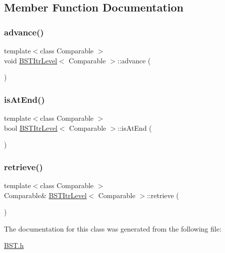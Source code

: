 \subsection{Member Function Documentation}
\mbox{\label{class_b_s_t_itr_level_ad54a6fa289a59d6050b507abe40d463b}} 
\subsubsection{\texorpdfstring{advance()}{advance()}}
{\footnotesize\ttfamily template$<$class Comparable $>$ \\
void \hyperlink{class_b_s_t_itr_level}{B\+S\+T\+Itr\+Level}$<$ Comparable $>$\+::advance (\begin{DoxyParamCaption}{ }\end{DoxyParamCaption})}

\mbox{\label{class_b_s_t_itr_level_a89bc8e81dde255fd6bad917cacc0d489}} 
\subsubsection{\texorpdfstring{is\+At\+End()}{isAtEnd()}}
{\footnotesize\ttfamily template$<$class Comparable $>$ \\
bool \hyperlink{class_b_s_t_itr_level}{B\+S\+T\+Itr\+Level}$<$ Comparable $>$\+::is\+At\+End (\begin{DoxyParamCaption}{ }\end{DoxyParamCaption})\hspace{0.3cm}{\ttfamily [inline]}}

\mbox{\label{class_b_s_t_itr_level_a0340bd9f21f72ae25348f383e67e7f91}} 
\subsubsection{\texorpdfstring{retrieve()}{retrieve()}}
{\footnotesize\ttfamily template$<$class Comparable $>$ \\
Comparable\& \hyperlink{class_b_s_t_itr_level}{B\+S\+T\+Itr\+Level}$<$ Comparable $>$\+::retrieve (\begin{DoxyParamCaption}{ }\end{DoxyParamCaption})\hspace{0.3cm}{\ttfamily [inline]}}



The documentation for this class was generated from the following file\+:\begin{DoxyCompactItemize}
\item 
\hyperlink{_b_s_t_8h}{B\+S\+T.\+h}\end{DoxyCompactItemize}
